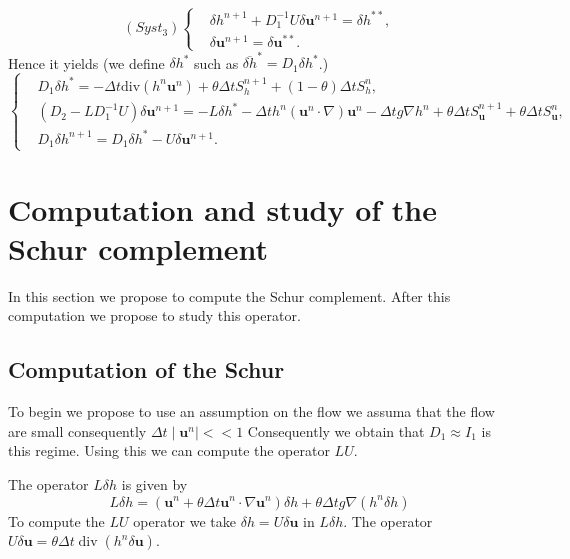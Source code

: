 \documentclass[a4paper, 11pt]{article}
\begin{document}
\begin{equation*}
(Syst_3)\left\{\begin{split}
&\delta h^{n+1}+D_1^{-1}U\delta \boldsymbol{u}^{n+1}=\delta h^{**},\\
&\delta \boldsymbol{u}^{n+1}=\delta \boldsymbol{u}^{**}.
\end{split}\right.
\end{equation*}
Hence it yields (we define $\delta h^*$ such as $\overline{\delta h}^*=D_1\delta h^*$.)
\begin{equation*}
\left\{
\begin{split}
&D_1\delta h^{*}=-\Delta t\text{div}(h^n\boldsymbol{u}^n)+\theta \Delta tS_h^{n+1}+(1-\theta)\Delta t S_{h}^n,\\
&(D_2-LD_1^{-1}U)\delta \boldsymbol{u}^{n+1}=-L\delta h^*-\Delta th^n(\boldsymbol{u}^n\cdot\nabla)\boldsymbol{u}^n-\Delta tg\nabla h^n+\theta\Delta tS_{\boldsymbol{u}}^{n+1}+\theta\Delta tS_{\boldsymbol{u}}^n,\\
&D_1\delta h^{n+1}=D_1\delta h^*-U\delta \boldsymbol{u}^{n+1}.
\end{split}\right.
\end{equation*}


\section{Computation and study of the Schur complement}
In this section we propose to compute the Schur complement. After this computation we propose to study this operator.

\subsection{Computation of the Schur}
To begin we propose to use an assumption on the flow we assuma that the flow are small consequently $\Delta t \mid \boldsymbol{u}^n\mid <<1$ Consequently we obtain that $D_1\approx I_1$ is this regime. Using this we can compute the operator $LU$.

The operator $L \delta h$ is given by
$$
L \delta h =(\boldsymbol{u}^n+\theta \Delta t \boldsymbol{u}^n\cdot \nabla \boldsymbol{u}^n )\delta h+\theta \Delta t g \nabla( h^n\delta h)
$$
To compute the $LU$ operator we take $\delta h=U\delta \boldsymbol{u}$ in $L \delta h$. The operator $U\delta \boldsymbol{u}=\theta \Delta t \operatorname{div}(h^n \delta \boldsymbol{u})$.
\end{document}
